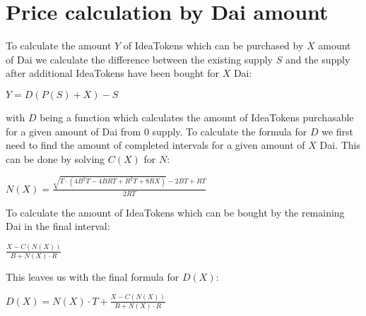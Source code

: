 \documentclass[12pt]{article}
\begin{document}
\section{Price calculation by Dai amount}
To calculate the amount $Y$ of IdeaTokens which can be purchased by $X$ amount of Dai we calculate the difference between the existing supply $S$ and the supply after additional IdeaTokens have been bought for $X$ Dai:
\begin{center}
$Y = D(P(S) + X) - S$
\end{center}
with $D$ being a function which calculates the amount of IdeaTokens purchasable for a given amount of Dai from $0$ supply. To calculate the formula for $D$ we first need to find the amount of completed intervals for a given amount of $X$ Dai. This can be done by solving $C(X)$ for $N$:
\begin{center}
$N(X) = \frac{\sqrt{T \cdot (4B^2T - 4BRT + R^2T + 8RX)} - 2BT + RT}{2RT}$
\end{center}
To calculate the amount of IdeaTokens which can be bought by the remaining Dai in the final interval:
\begin{center}
$\frac{X - C(N(X))}{B + N(X) \cdot R}$
\end{center}
This leaves us with the final formula for $D(X)$:
\begin{center}
$D(X) = N(X) \cdot T + \frac{X - C(N(X))}{B + N(X) \cdot R}$
\end{center}
\end{document}
